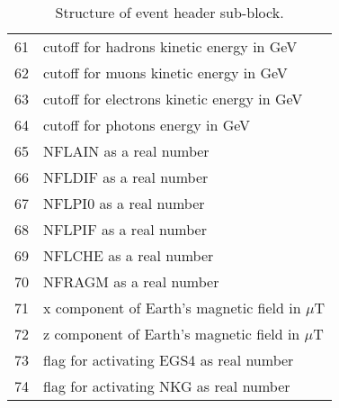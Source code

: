 {\begin{table}[p]
\begin{center}
\begin{tabular}{|r|l|}
61& cutoff for hadrons kinetic energy in GeV  \\
62& cutoff for muons kinetic energy in GeV  \\
63& cutoff for electrons kinetic energy in GeV  \\
64& cutoff for photons energy in GeV  \\
65& NFLAIN as a real number  \\
66& NFLDIF as a real number  \\
67& NFLPI0 as a real number  \\
68& NFLPIF as a real number  \\
69& NFLCHE as a real number  \\
70& NFRAGM as a real number  \\
71& x component of Earth's magnetic field in $\mu$T  \\
72& z component of Earth's magnetic field in $\mu$T  \\
73& flag for activating EGS4 as real number  \\
74& flag for activating NKG as real number \\
\hline
    \end{tabular}
  \end{center}
  \caption{Structure of event header sub-block.}
  \label{tab:eh1}
\end{table}
}

